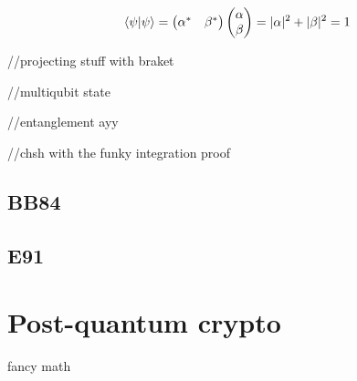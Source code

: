 \documentclass{report}
\begin{document}
$$\braket{\psi}{\psi}=\begin{pmatrix}\alpha^*&\beta^*\end{pmatrix}\begin{pmatrix}\alpha\\\beta\end{pmatrix}=|\alpha|^2+|\beta|^2=1$$

//projecting stuff with braket

//multiqubit state

//entanglement ayy

//chsh with the funky integration proof

\chapter{BB84}
\chapter{E91}
\part{Post-quantum crypto}
fancy math
\end{document}
